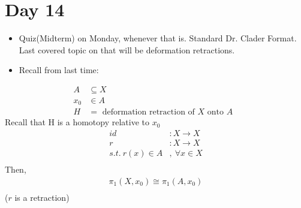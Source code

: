 \section{Day 14}
    \begin{itemize}
        \item Quiz(Midterm) on Monday, whenever that is. Standard Dr. Clader Format. Last
            covered topic on that will be deformation retractions.
        \item Recall from last time:
    \end{itemize}
    \begin{theorem}
        \begin{align*}
            A&\subseteq X\\
            x_0& \in A\\
            H&=\text{ deformation retraction of $X$ onto $A$ }
        \end{align*}
        Recall that H is a homotopy relative to $x_0$
        \begin{align*}
            id&: X\rightarrow X\\
            r&: X \rightarrow X\\
            s.t.\ r(x)\in A&,\ \forall x\in X\\
        \end{align*}
        Then,
        \begin{align*}
            \pi_1(X,x_0)\cong\pi_1(A,x_0)\\
        \end{align*}
        ($r$ is a retraction)
    \end{theorem}
